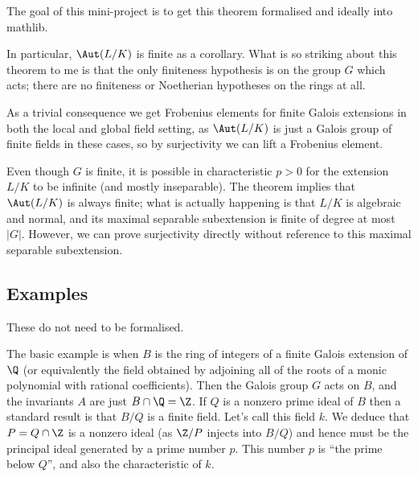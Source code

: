 The goal of this mini-project is to get this theorem formalised and ideally into mathlib.

In particular, $\Aut(L/K)$ is finite
as a corollary. What is so striking about this theorem to me is that the only finiteness hypothesis
is on the group $G$ which acts; there are no finiteness or Noetherian
hypotheses on the rings at all.

As a trivial consequence we get Frobenius elements for finite Galois extensions in both
the local and global field setting, as $\Aut(L/K)$ is just a Galois group of finite fields
in these cases, so by surjectivity we can lift a Frobenius element.

Even though $G$ is finite, it is possible in characteristic $p>0$ for the extension $L/K$ to be
infinite (and mostly inseparable). The theorem implies that $\Aut(L/K)$ is always finite;
what is actually happening is that $L/K$ is algebraic and normal, and its maximal separable
subextension is finite of degree at most $|G|$. However, we can prove surjectivity directly
without reference to this maximal separable subextension.

\subsection{Examples}

These do not need to be formalised.

The basic example is when $B$ is the ring of integers of a finite Galois extension of $\Q$
(or equivalently the field obtained by adjoining all of the roots of
a monic polynomial with rational coefficients).
Then the Galois group $G$ acts on $B$, and the invariants $A$ are just $B\cap\Q=\Z$. If $Q$
is a nonzero prime ideal of $B$ then a standard result is that $B/Q$ is a finite field. Let's
call this field $k$. We deduce that $P=Q\cap \Z$ is a nonzero ideal (as $\Z/P$ injects into $B/Q$)
and hence must be
the principal ideal generated by a prime number $p$. This number $p$ is ``the prime below $Q$'',
and also the characteristic of $k$.

